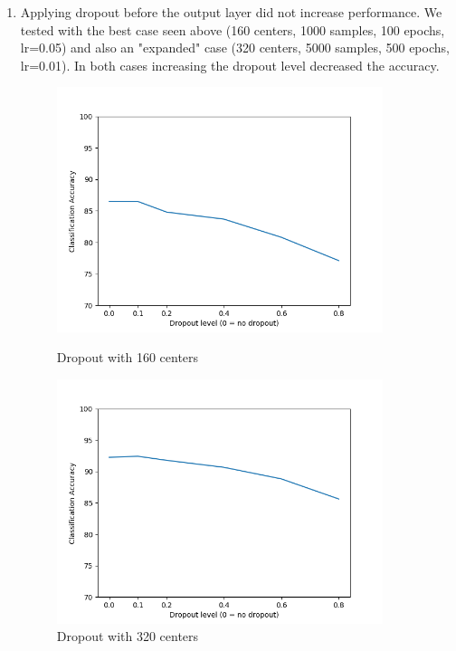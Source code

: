 \documentclass[11pt]{article}
\begin{document}
\begin{enumerate}
\begin{enumerate}
\item
Applying dropout before the output layer did not increase performance. We tested with the best case seen above (160 centers, 1000 samples, 100 epochs, lr=0.05) and also an "expanded" case (320 centers, 5000 samples, 500 epochs, lr=0.01). In both cases increasing the dropout level decreased the accuracy.
\begin{figure}[h!]
    \centering
    \begin{minipage}{0.45\textwidth}
    	\centering
        \includegraphics[width=0.9\textwidth]{q2_dropout1}
        \caption{Dropout with 160 centers}
    \end{minipage}\hfill
    \begin{minipage}{0.45\textwidth}
    	\centering
         \includegraphics[width=0.9\textwidth]{q2_dropout2}
         \caption{Dropout with 320 centers}
    \end{minipage}\hfill
\end{figure}


\end{enumerate}
\end{enumerate}
\end{document}
